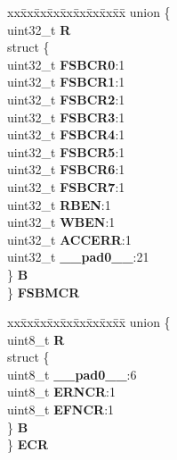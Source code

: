 \begin{DoxyCompactItemize}
\begin{tabbing}
\end{tabbing}\item 
\mbox{\label{structECSM__tag_accc72a74fe3ab04cf7a500a07327e720}} 
\begin{tabbing}
xx\=xx\=xx\=xx\=xx\=xx\=xx\=xx\=xx\=\kill
union \{\\
\>uint32\_t {\bfseries R}\\
\>struct \{\\
\>\>uint32\_t {\bfseries FSBCR0}:1\\
\>\>uint32\_t {\bfseries FSBCR1}:1\\
\>\>uint32\_t {\bfseries FSBCR2}:1\\
\>\>uint32\_t {\bfseries FSBCR3}:1\\
\>\>uint32\_t {\bfseries FSBCR4}:1\\
\>\>uint32\_t {\bfseries FSBCR5}:1\\
\>\>uint32\_t {\bfseries FSBCR6}:1\\
\>\>uint32\_t {\bfseries FSBCR7}:1\\
\>\>uint32\_t {\bfseries RBEN}:1\\
\>\>uint32\_t {\bfseries WBEN}:1\\
\>\>uint32\_t {\bfseries ACCERR}:1\\
\>\>uint32\_t {\bfseries \_\_pad0\_\_}:21\\
\>\} {\bfseries B}\\
\} {\bfseries FSBMCR}\\

\end{tabbing}\item 
\mbox{\label{structECSM__tag_ab635271b4e3e045d3f5a10c1588315a6}} 
\begin{tabbing}
xx\=xx\=xx\=xx\=xx\=xx\=xx\=xx\=xx\=\kill
union \{\\
\>uint8\_t {\bfseries R}\\
\>struct \{\\
\>\>uint8\_t {\bfseries \_\_pad0\_\_}:6\\
\>\>uint8\_t {\bfseries ERNCR}:1\\
\>\>uint8\_t {\bfseries EFNCR}:1\\
\>\} {\bfseries B}\\
\} {\bfseries ECR}\\


\end{tabbing}
\end{DoxyCompactItemize}
